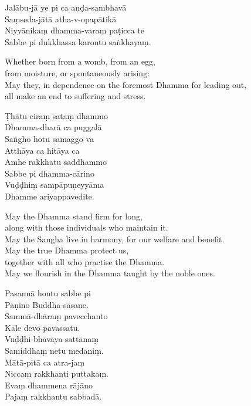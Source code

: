 Jalābu-jā ye pi ca aṇḍa-sambhavā\\
Saṃseda-jātā atha-v-opapātikā\\
Niyyānikaṃ dhamma-varaṃ paṭicca te\\
Sabbe pi dukkhassa karontu saṅkhayaṃ.

\begin{english}
  Whether born from a womb, from an egg,\\
  from moisture, or spontaneously arising:\\
  May they, in dependence on the foremost Dhamma for leading out,\\
  all make an end to suffering and stress.
\end{english}

Ṭhātu ciraṃ sataṃ dhammo\\
Dhamma-dharā ca puggalā\\
Saṅgho hotu samaggo va\\
Atthāya ca hitāya ca\\
Amhe rakkhatu saddhammo\\
Sabbe pi dhamma-cārino\\
Vuḍḍhiṃ sampāpuṇeyyāma\\
Dhamme ariyappavedite.

\begin{english}
  May the Dhamma stand firm for long,\\
  along with those individuals who maintain it.\\
  May the Sangha live in harmony, for our welfare and benefit.\\
  May the true Dhamma protect us,\\
  together with all who practise the Dhamma.\\
  May we flourish in the Dhamma taught by the noble ones.
\end{english}

\sidepar{\pointerMark}%
Pasannā hontu sabbe pi\\
Pāṇino Buddha-sāsane.\\
Sammā-dhāraṃ pavecchanto\\
Kāle devo pavassatu.\\
Vuḍḍhi-bhāvāya sattānaṃ\\
Samiddhaṃ netu medaniṃ.\\
Mātā-pitā ca atra-jaṃ\\
Niccaṃ rakkhanti puttakaṃ.\\
Evaṃ dhammena rājāno\\
Pajaṃ rakkhantu sabbadā.

